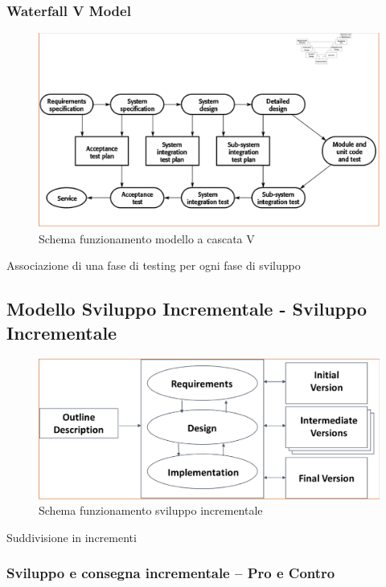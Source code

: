 \documentclass{article}
\begin{document}
	\subsubsection{Waterfall V Model}
	\begin{figure}[h]
		\centering
		\includegraphics[scale=0.3]{6.mod_cascata_v.png}
		\caption{Schema funzionamento modello a cascata V}
		\label{fig:im-6}
	\end{figure}
	Associazione di una fase di testing per ogni fase di sviluppo
	\subsection{Modello Sviluppo Incrementale - Sviluppo Incrementale}
	\begin{figure}[h]
		\centering
		\includegraphics[scale=0.3]{7.svil_inc.png}
		\caption{Schema funzionamento sviluppo incrementale}
		\label{fig:im-7}
	\end{figure}
	Suddivisione in incrementi
	\subsubsection{Sviluppo e consegna incrementale – Pro e Contro}
\end{document}
